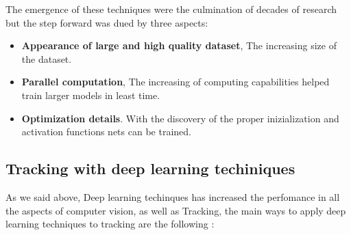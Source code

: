 \documentclass[12pt, a4paper, titlepage,twoside,openright]{article}
\begin{document}
The emergence of these techniques were the culmination of decades of research but the step forward was dued by three aspects:

\begin{itemize}

\item \textbf{Appearance of large and high quality dataset}, The increasing size of the dataset.

\item \textbf{Parallel computation}, The increasing of computing capabilities helped train larger models in least time.

\item \textbf{Optimization details}. With the discovery of the proper inizialization and activation functions nets can be trained.


\end{itemize}


\subsection{Tracking with deep learning techiniques}

As we said above, Deep learning techinques has increased the perfomance in all the aspects of computer vision, as well as Tracking, the main ways to apply deep learning techniques to tracking are the following \cite{thrun}:
\end{document}
